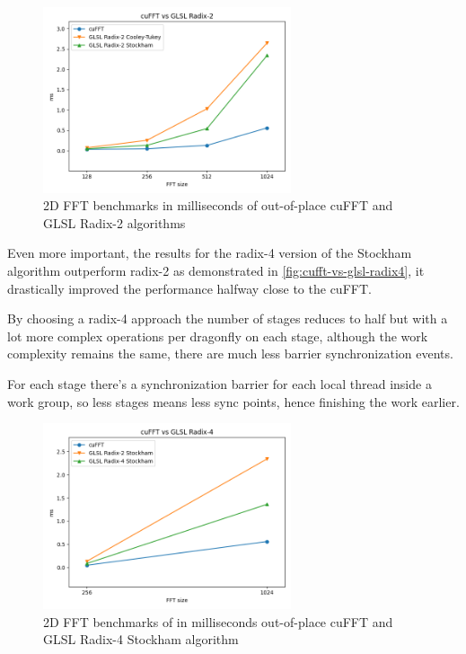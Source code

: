 \documentclass[
  oneside,
  11pt, a4paper,
  footinclude=true,
  headinclude=true,
  cleardoublepage=empty
]{scrbook}
\begin{document}
\begin{figure}[h] 
    \centering
    \includegraphics[width=0.65\textwidth]{img/results/cufft_vs_glsl_radix2.png}
    \caption{2D FFT benchmarks in milliseconds of out-of-place cuFFT and GLSL Radix-2 algorithms}
    \label{fig:cufft-vs-glsl-radix2}
\end{figure}

Even more important, the results for the radix-4 version of the Stockham algorithm outperform radix-2 as demonstrated in \autoref{fig:cufft-vs-glsl-radix4}, it drastically improved the performance halfway close to the cuFFT.

By choosing a radix-4 approach the number of stages reduces to half but with a lot more complex operations per dragonfly on each stage, although the work complexity remains the same, there are much less barrier synchronization events.

For each stage there's a synchronization barrier for each local thread inside a work group, so less stages means less sync points, hence finishing the work earlier.

\begin{figure}[h] 
    \centering
    \includegraphics[width=0.65\textwidth]{img/results/cufft_vs_glsl_radix4.png}
    \caption{2D FFT benchmarks of in milliseconds out-of-place cuFFT and GLSL Radix-4 Stockham algorithm}
    \label{fig:cufft-vs-glsl-radix4}
\end{figure}
\end{document}
